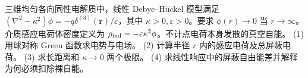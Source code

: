 三维均匀各向同性电解质中，线性 Debye--Hückel 模型满足 \((\nabla^2-\kappa^2)\phi=-q\delta^{(3)}(\boldsymbol r)/\varepsilon\)，其中 \(\kappa>0,\varepsilon>0\)。要求 \(\phi(r)\to0\) 当 \(r\to\infty\)。介质感应电荷体密度定义为 \(\rho_{\rm ind}=-\varepsilon\kappa^2\phi\)。不计点电荷本身发散的真空自能。
(1) 用球对称 Green 函数求电势与电场。
(2) 计算半径 \(r\) 内的感应电荷及总屏蔽电荷。
(3) 求长距离和 \(\kappa\to0\) 两个极限。
(4) 求线性响应中的屏蔽自由能差并解释为何必须扣除裸自能。
